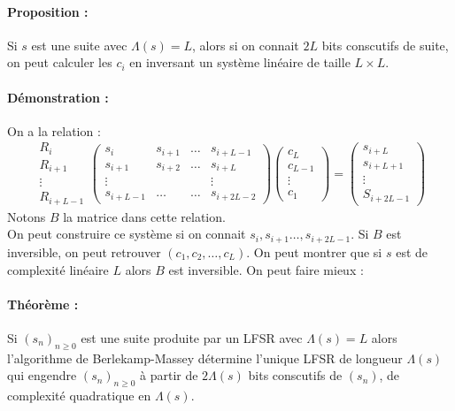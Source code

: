 \documentclass[12pt,a4paper]{report}
\begin{document}
\paragraph{Proposition :\\}
Si $s$ est une suite avec $\Lambda(s)=L$, alors si on connait $2L$ bits conscutifs de suite, on peut calculer les $c_i$ en inversant un système linéaire de taille $L\times L$.
\paragraph{Démonstration :\\}
On a la relation :
$$ \begin{array}{c}
R_i \\
R_{i+1} \\
\vdots \\
R_{i+L-1} \end{array} 
\left( \begin{array}{cccc}
s_i & s_{i+1} & \ldots & s_{i+L-1} \\
s_{i+1} & s_{i+2} & \ldots & s_{i+L} \\
\vdots & & & \vdots \\
s_{i+L-1} & \ldots & \ldots & s_{i+2L-2} \end{array} \right) 
\left( \begin{array}{c}
c_L \\
c_{L-1} \\
\vdots \\
c_1 \end{array} \right) = \left( \begin{array}{c}
s_{i+L} \\
s_{i+L+1} \\
\vdots \\
S_{i+2L-1} \end{array} \right) $$
Notons $B$ la matrice dans cette relation.\\

On peut construire ce système si on connait $s_i, s_{i+1}\ldots, s_{i+2L-1}$. Si $B$ est inversible, on peut retrouver $(c_1,c_2,\ldots,c_L)$. On peut montrer que si $s$ est de complexité linéaire $L$ alors $B$ est inversible. On peut faire mieux :
\paragraph{Théorème :\\}
Si $(s_n)_{n \geqslant 0}$ est une suite produite par un LFSR avec $\Lambda (s) = L$ alors l'algorithme de Berlekamp-Massey détermine l'unique LFSR de longueur $\Lambda(s)$ qui engendre $(s_n)_{n \geqslant 0}$ à partir de $2 \Lambda(s)$ bits conscutifs de $(s_n)$, de complexité quadratique en $\Lambda(s)$.
\end{document}
